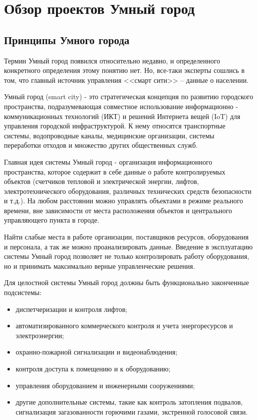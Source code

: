 
\section{Обзор проектов Умный город}
\subsection{Принципы Умного города}
Термин Умный город появился относительно недавно, и определенного конкретного определения этому понятию нет. Но, все-таки  эксперты сошлись в том, что главный источник управления <<смарт сити>> – данные о населении. 

Умный город (smart city) - это стратегическая концепция по развитию городского пространства, подразумевающая совместное использование информационно - коммуникационных технологий (ИКТ) и решений Интернета вещей (IoT) для управления городской инфраструктурой. К нему относятся транспортные системы, водопроводные каналы, медицинские организации, системы переработки отходов и множество других общественных служб. \cite{Harrison} 

Главная идея системы Умный город - организация информационного пространства, которое содержит в себе данные о работе контролируемых объектов (счетчиков тепловой и электрической энергии, лифтов, электротехнического оборудования, различных технических средств безопасности и т.д.). На любом расстоянии можно управлять объектами в режиме реального времени, вне зависимости от места расположения объектов и центрального управляющего пункта в городе.\cite{NK}

Найти слабые места в работе организации, поставщиков ресурсов, оборудования и персонала, а так же можно проанализировать данные. Введение в эксплуатацию системы Умный город позволяет не только контролировать работу оборудования, но и принимать максимально верные управленческие решения. 

Для целостной системы Умный город должны быть функционально законченные подсистемы:
\begin{itemize}
	\item диспетчеризации и контроля лифтов; 
	\item автоматизированного коммерческого контроля и учета энергоресурсов и электроэнергии; 
	\item охранно-пожарной сигнализации и видеонаблюдения; 
	\item контроля доступа к помещению и к оборудованию; 
	\item управления оборудованием и инженерными сооружениями; 
	\item другие дополнительные системы, такие как контроль затопления подвалов, сигнализация загазованности горючими газами, экстренной голосовой связи.
\end{itemize}

